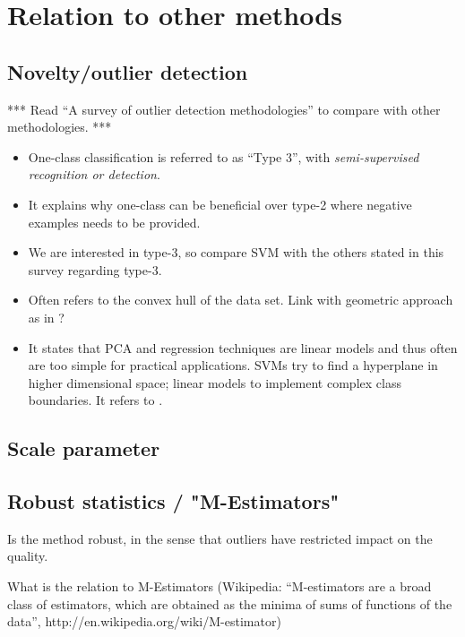\section{Relation to other methods}

\subsection{Novelty/outlier detection}
*** Read \cite{hodge2004survey} ``A survey of outlier detection methodologies'' to compare with other methodologies. ***
\begin{itemize}
  \item One-class classification is referred to as ``Type 3'', with \emph{semi-supervised recognition or detection}.
  \item It explains why one-class can be beneficial over type-2 where negative examples needs to be provided.
  \item We are interested in type-3, so compare SVM with the others stated in this survey regarding type-3.
  \item Often refers to the convex hull of the data set. Link with geometric approach as in \cite{bennett2000duality,mavroforakis2006geometric}?
  \item It states that PCA and regression techniques are linear models and thus often are too simple for practical applications. SVMs try to find a hyperplane in higher dimensional space; linear models to implement complex class boundaries. It refers to \cite{tax1999support}.
\end{itemize}


\subsection{Scale parameter}
\subsection{Robust statistics / "M-Estimators"}
Is the method robust, in the sense that outliers have restricted impact on the quality.

What is the relation to M-Estimators (Wikipedia: ``M-estimators are a broad class of estimators, which are obtained as the minima of sums of functions of the data'', http://en.wikipedia.org/wiki/M-estimator)


